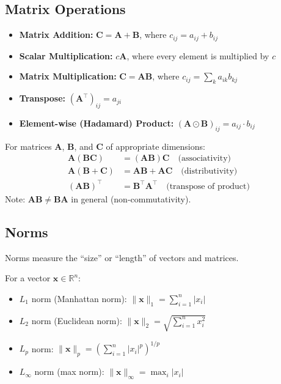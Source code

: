 \subsection{Matrix Operations}

\begin{itemize}
    \item \textbf{Matrix Addition:} $\mathbf{C} = \mathbf{A} + \mathbf{B}$, where $c_{ij} = a_{ij} + b_{ij}$
    \item \textbf{Scalar Multiplication:} $c\mathbf{A}$, where every element is multiplied by $c$
    \item \textbf{Matrix Multiplication:} $\mathbf{C} = \mathbf{AB}$, where $c_{ij} = \sum_{k} a_{ik}b_{kj}$
    \item \textbf{Transpose:} $(\mathbf{A}^\top)_{ij} = a_{ji}$
    \item \textbf{Element-wise (Hadamard) Product:} $(\mathbf{A} \odot \mathbf{B})_{ij} = a_{ij} \cdot b_{ij}$
\end{itemize}

\begin{property}
For matrices $\mathbf{A}$, $\mathbf{B}$, and $\mathbf{C}$ of appropriate dimensions:
\begin{align}
\mathbf{A}(\mathbf{BC}) &= (\mathbf{AB})\mathbf{C} \quad \text{(associativity)} \\
\mathbf{A}(\mathbf{B} + \mathbf{C}) &= \mathbf{AB} + \mathbf{AC} \quad \text{(distributivity)} \\
(\mathbf{AB})^\top &= \mathbf{B}^\top \mathbf{A}^\top \quad \text{(transpose of product)}
\end{align}
Note: $\mathbf{AB} \neq \mathbf{BA}$ in general (non-commutativity).
\end{property}

\subsection{Norms}

Norms measure the ``size'' or ``length'' of vectors and matrices.

\begin{definition}
For a vector $\mathbf{x} \in \mathbb{R}^n$:
\begin{itemize}
    \item $L_1$ norm (Manhattan norm): $\|\mathbf{x}\|_1 = \sum_{i=1}^{n} |x_i|$
    \item $L_2$ norm (Euclidean norm): $\|\mathbf{x}\|_2 = \sqrt{\sum_{i=1}^{n} x_i^2}$
    \item $L_p$ norm: $\|\mathbf{x}\|_p = \left(\sum_{i=1}^{n} |x_i|^p\right)^{1/p}$
    \item $L_\infty$ norm (max norm): $\|\mathbf{x}\|_\infty = \max_i |x_i|$
\end{itemize}
\end{definition}

